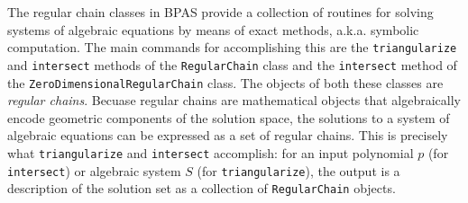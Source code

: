 The regular chain classes in BPAS  provide a collection of routines
for solving systems of algebraic equations by means
of exact methods, a.k.a. symbolic computation.
The main commands for accomplishing this are the
\texttt{triangularize} and
\texttt{intersect} methods of the
\texttt{RegularChain} class and the
\texttt{intersect} method of the
\texttt{ZeroDimensionalRegularChain} class. The objects of both these
classes are \emph{regular chains}. Becuase regular chains are
mathematical objects that algebraically encode geometric components of
the solution space, the solutions to a system of algebraic equations
can be expressed as a set of regular chains. This is precisely what
\texttt{triangularize} and
\texttt{intersect} accomplish: for an input
polynomial $p$ (for \texttt{intersect}) or algebraic system $S$ (for
\texttt{triangularize}), the output is a description of the solution
set as a collection of \texttt{RegularChain} objects.
